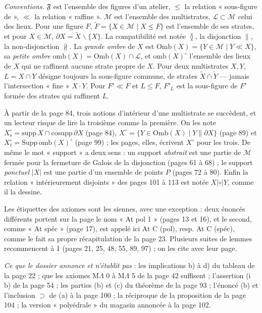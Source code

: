 \documentclass[11pt,a4paper]{article}
\begin{document}
\emph{Conventions.} $\mathfrak{F}$ est l'ensemble des figures d'un atelier,
$\leq$ la relation « sous-figure de », $\ll$ la relation « raffine ».
$\mathcal{M}$ est l'ensemble des multistrates, $\mathcal{L} \subset \mathcal{M}$
celui des lieux. Pour une figure $F$, $\widetilde{F} = \{X \in \mathcal{M} \mid
X \leq F\}$ est l'ensemble de ses strates, et pour $X \in \mathcal{M}$,
$\partial X = \widetilde{X} \smallsetminus \{X\}$. La compatibilité est notée
$\between$, la disjonction $\parallel$, la non-disjonction $\nparallel$. La
\emph{grande ombre} de $X$ est $\mathrm{Omb}(X) = \{Y \in \mathcal{M} \mid Y \ll
X\}$, sa \emph{petite ombre} $\mathrm{omb}(X) = \mathrm{Omb}(X) \cap
\mathcal{L}$, et $\mathrm{omb}(X)^{\circ}$ l'ensemble des lieux de $X$ qui ne
raffinent aucune strate propre de $X$. Pour deux multistrates $X, Y$, $L = X
\cap Y$ désigne toujours la sous-figure commune, de strates $\widetilde{X} \cap
\widetilde{Y}$ --- jamais l'intersection « fine » $X \cdot Y$. Pour $F' \ll F$ et
$L \leq F$, $F'_{L}$ est la sous-figure de $F'$ formée des strates qui
raffinent $L$.

À partir de la page 84, trois notions d'intérieur d'une multistrate se
succèdent, et un lecteur risque de lire la troisième comme la première. On les
note $X^{\circ}_{\mathrm{s}} = \mathrm{supp}\, X \cap \mathrm{cosupp}\, \partial X$
(page 84), $X^{\circ} = \{Y \in \mathrm{Omb}(X) \mid Y \parallel \partial X\}$
(page 89) et $X^{\circ}_{\ell} = \mathrm{Supp}\, \mathrm{omb}(X)^{\circ}$ (page
99) ; les pages, elles, écrivent $X^{\circ}$ pour les trois. De même le mot
« support » a deux sens : un support \emph{abstrait} est une partie de
$\mathcal{M}$ fermée pour la fermeture de Galois de la disjonction (pages 61 à
68) ; le support \emph{ponctuel} $|X|$ est une partie d'un ensemble de points
$P$ (pages 72 à 80). Enfin la relation « intérieurement disjoints » des pages
101 à 113 est notée $X \mathrel{|{\circ}|} Y$, comme il la dessine.

Les étiquettes des axiomes sont les siennes, avec une exception : deux
énoncés différents portent sur la page le nom « At pol 1 » (pages 13 et 16), et
le second, comme « At spéc » (page 17), est appelé ici At C (pol), resp. At C
(spéc), comme le fait sa propre récapitulation de la page 23. Plusieurs suites
de lemmes recommencent à 1 (pages 21, 25, 48, 55, 89, 97) ; on les cite avec
leur page.

\emph{Ce que le dossier annonce et n'établit pas} : les implications b) à d) du
tableau de la page 22 ; que les axiomes M$\Lambda$ 0 à M$\Lambda$ 5 de la page
42 suffisent ; l'assertion (i b) de la page 54 ; les parties (b) et (c) du
théorème de la page 93 ; l'énoncé (b) et l'inclusion $\supset$ de (a) à la page
100 ; la réciproque de la proposition de la page 104 ; la version « polyédrale »
du magasin annoncée à la page 102.
\end{document}
